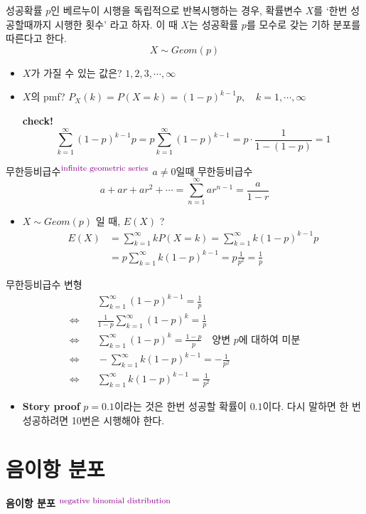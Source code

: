 \documentclass{oblivoir}
\newcommand{\DC}[1]{\textcolor{DarkMagenta}{#1}}%
\newcommand{\UP}[1]{$^{\mbox{\DC{\footnotesize #1}}}$}
\begin{document}
성공확률 $p$인 베르누이 시행을 독립적으로 반복시행하는 경우, 확률변수 $X$를 `한번 성공할때까지 시행한 횟수' 라고 하자.
이 때 $X$는 성공확률 $p$를 모수로 갖는 기하 분포를 따른다고 한다.
$$
X \sim Geom(p)
$$
\begin{itemize}
\item $X$가 가질 수 있는 값은? $1, 2, 3, \cdots, \infty$
\item $X$의 pmf? $P_X(k) = P(X=k) = (1-p)^{k-1}p, \quad k = 1, \cdots, \infty$ \par
\textbf{check!}
$$
\sum_{k=1}^{\infty} (1-p)^{k-1}p =  p\sum_{k=1}^{\infty} (1-p)^{k-1} = p \cdot \frac{1}{1-(1-p)} = 1
$$
\end{itemize}
\begin{myframe}{무한등비급수\UP{infinite geometric series}}
$a \neq 0$일때 무한등비급수
$$
a + ar + ar^2 + \cdots = \sum_{n=1}^{\infty} ar^{n-1} = \frac{a}{1-r}
$$
\end{myframe}
\begin{itemize}
\item $X \sim Geom(p)$ 일 때, $E(X)$ ?
\begin{align*}
E(X) &= \sum_{k=1}^{\infty} k P(X=k) = \sum_{k=1}^{\infty} k (1-p)^{k-1} p \\
&= p\sum_{k=1}^{\infty} k (1-p)^{k-1} = p \frac{1}{p^2} = \frac{1}{p}
\end{align*}
\end{itemize}
\begin{myframe}{무한등비급수 변형}
\begin{align*}
 & \quad \sum_{k=1}^{\infty} (1-p)^{k-1} = \frac{1}{p} \\
\Leftrightarrow& \quad \frac{1}{1-p}\sum_{k=1}^{\infty} (1-p)^{k} = \frac{1}{p} \\
\Leftrightarrow& \quad \sum_{k=1}^{\infty} (1-p)^{k} = \frac{1-p}{p} \quad \mbox{양변 $p$에 대하여 미분} \\
\Leftrightarrow& \quad - \sum_{k=1}^{\infty} k(1-p)^{k-1} = -\frac{1}{p^2} \\
\Leftrightarrow& \quad \sum_{k=1}^{\infty} k(1-p)^{k-1} = \frac{1}{p^2}
\end{align*}
\end{myframe}
\begin{itemize}
\item \textbf{Story proof} $p=0.1$이라는 것은 한번 성공할 확률이 $0.1$이다. 다시 말하면 한 번 성공하려면 10번은 시행해야 한다.
\end{itemize}

\section{음이항 분포}
\textbf{음이항 분포  \UP{negative binomial distribution}}
\end{document}
